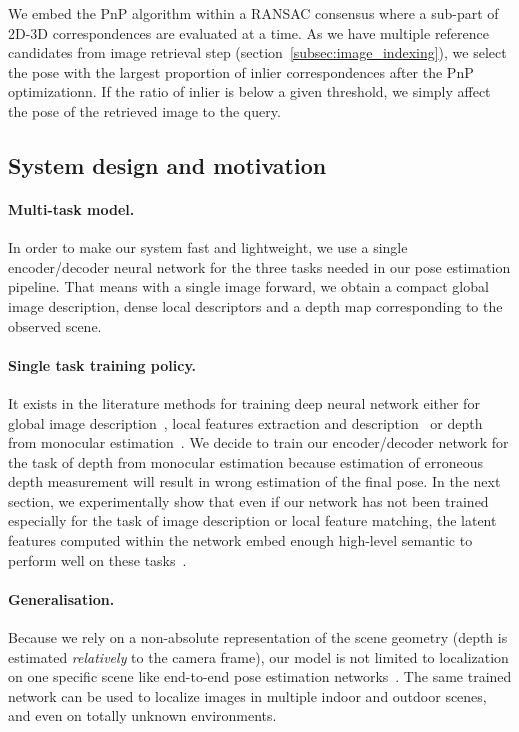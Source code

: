 We embed the PnP algorithm within a RANSAC consensus where a sub-part of 2D-3D correspondences are evaluated at a time. As we have multiple reference candidates from image retrieval step (section~\ref{subsec:image_indexing}), we select the pose with the largest proportion of inlier correspondences after the PnP optimizationn. If the ratio of inlier is below a given threshold, we simply affect the pose of the retrieved image to the query.

\subsection{System design and motivation}
\paragraph{Multi-task model.} In order to make our system fast and lightweight, we use a single encoder/decoder neural network for the three tasks needed in our pose estimation pipeline. That means with a single image forward, we obtain a compact global image description, dense local descriptors and a depth map corresponding to the observed scene.
\paragraph{Single task training policy.} It exists in the literature methods for training deep neural network either for global image description~\citep{Arandjelovic2017, Radenovic2017, Gordo2017}, local features extraction and description~\citep{Yi2016a, Rocco2018, Ono2018} or depth from monocular estimation~\citep{Eigen2014, Godard2017, Mahjourian2018}. We decide to train our encoder/decoder network for the task of depth from monocular estimation because estimation of erroneous depth measurement will result in wrong estimation of the final pose. In the next section, we experimentally show that even if our network has not been trained especially for the task of image description or local feature matching, the latent features computed within the network embed enough high-level semantic to perform well on these tasks~\citep{Taira2018, Zamir2018}.
\paragraph{Generalisation.} Because we rely on a non-absolute representation of the scene geometry (depth is estimated \textit{relatively} to the camera frame), our model is not limited to localization on one specific scene like end-to-end pose estimation networks~\citep{Kendall2017, Brachmann2017b}. The same trained network can be used to localize images in multiple indoor and outdoor scenes, and even on totally unknown environments. 